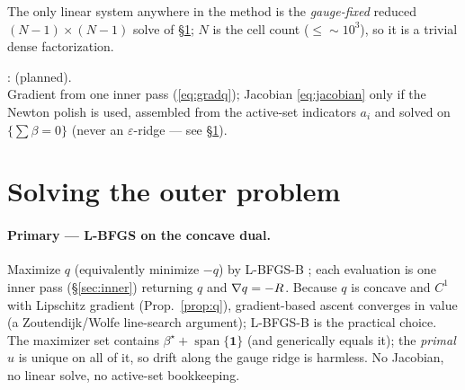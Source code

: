 \documentclass[11pt,a4paper]{article}
\begin{document}
The only linear system anywhere in the method is the \emph{gauge-fixed} reduced
$(N-1)\times(N-1)$ solve of \S\ref{sec:solve}; $N$ is the cell count ($\le\!\sim\!10^3$), so
it is a trivial dense factorization.

\begin{tcolorbox}[colback=blue!4!white, colframe=blue!40!black,
                  title={Code: outer gradient / Jacobian}, fontupper=\small]
:  (planned).\\[2pt]
Gradient  from one inner pass (\eqref{eq:gradq}); Jacobian \eqref{eq:jacobian} only
if the Newton polish is used, assembled from the active-set indicators $a_i$ and solved on
$\{\sum\beta=0\}$ (never an $\varepsilon$-ridge --- see \S\ref{sec:solve}).
\end{tcolorbox}

\section{Solving the outer problem}
\label{sec:solve}
\paragraph{Primary --- L-BFGS on the concave dual.} Maximize $q$ (equivalently minimize
$-q$) by L-BFGS-B \cite{byrd1995lbfgsb}; each evaluation is one inner pass
(\S\ref{sec:inner}) returning $q$ and $\nabla q=-R$. Because $q$ is concave and $C^1$ with
Lipschitz gradient (Prop.~\ref{prop:q}), gradient-based ascent converges in value (a
Zoutendijk/Wolfe line-search argument); L-BFGS-B is the practical choice. The maximizer set
contains $\beta^\star+\operatorname{span}\{\mathbf 1\}$ (and generically equals it); the
\emph{primal} $u$ is unique on all of it, so drift along the gauge ridge is harmless. No
Jacobian, no linear solve, no active-set bookkeeping.
\end{document}
